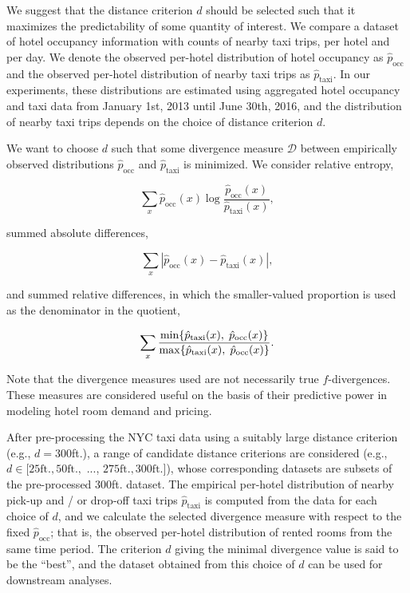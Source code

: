 \documentclass[useAMS, usenatbib]{biom}
\begin{document}
We suggest that the distance criterion $d$ should be selected such that it maximizes the predictability of some quantity of interest. We compare a dataset of hotel occupancy information with counts of nearby taxi trips, per hotel and per day. We denote the observed per-hotel distribution of hotel occupancy as $\hat{p}_{\mathrm{occ}}$ and the observed per-hotel distribution of nearby taxi trips as $\hat{p}_{\mathrm{taxi}}$. In our experiments, these distributions are estimated using aggregated hotel occupancy and taxi data from January 1st, 2013 until June 30th, 2016, and the distribution of nearby taxi trips depends on the choice of distance criterion $d$.

We want to choose $d$ such that some divergence measure $\mathcal{D}$ between empirically observed distributions $\hat{p}_{\mathrm{occ}}$ and $\hat{p}_{\mathrm{taxi}}$ is minimized. We consider relative entropy,

$$\sum_x \hat{p}_{\mathrm{occ}} (x) \log \frac{\hat{p}_{\mathrm{occ}} (x)}{\hat{p}_{\mathrm{taxi}} (x)},$$

summed absolute differences,

$$\sum_x | \hat{p}_{\mathrm{occ}} (x) - \hat{p}_{\mathrm{taxi}} (x) |,$$

and summed relative differences, in which the smaller-valued proportion is used as the denominator in the quotient,

$$\sum_x \frac{\min \{ \hat{p}_{\mathrm{taxi}} (x), \hspace*{0.1cm} \hat{p}_{\mathrm{occ}} (x) \}}{\max \{ \hat{p}_{\mathrm{taxi}} (x), \hspace*{0.1cm} \hat{p}_{\mathrm{occ}} (x) \}}.$$

Note that the divergence measures used are not necessarily true $f$-divergences. These measures are considered useful on the basis of their predictive power in modeling hotel room demand and pricing.

After pre-processing the NYC taxi data using a suitably large distance criterion (e.g., $d = 300$ft.), a range of candidate distance criterions are considered (e.g., $d \in [25 \mathrm{ft.}, 50 \mathrm{ft.},$ ..., $275 \mathrm{ft.}, 300 \mathrm{ft.}]$), whose corresponding datasets are subsets of the pre-processed 300ft. dataset. The empirical per-hotel distribution of nearby pick-up and / or drop-off taxi trips $\hat{p}_{\mathrm{taxi}}$ is computed from the data for each choice of $d$, and we calculate the selected divergence measure with respect to the fixed $\hat{p}_{\mathrm{occ}}$; that is, the observed per-hotel distribution of rented rooms from the same time period. The criterion $d$ giving the minimal divergence value is said to be the ``best'', and the dataset obtained from this choice of $d$ can be used for downstream analyses.
\end{document}
